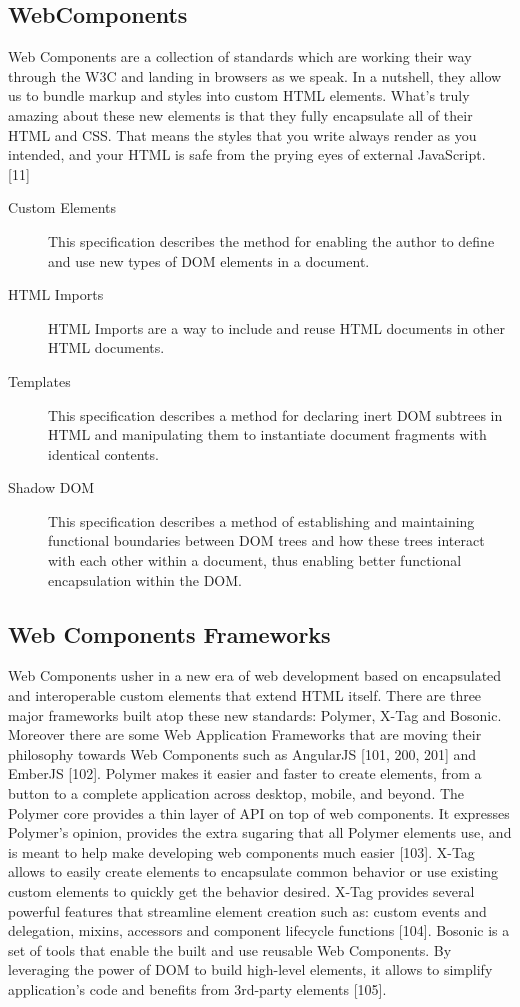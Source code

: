 \documentclass{sig-alternate}
\begin{document}
\subsection{WebComponents}

Web Components are a collection of standards which are working their way through the W3C and landing in browsers as we speak. In a nutshell, they allow us to bundle markup and styles into custom HTML elements. What's truly amazing about these new elements is that they fully encapsulate all of their HTML and CSS. That means the styles that you write always render as you intended, and your HTML is safe from the prying eyes of external JavaScript. [11]

\begin{description}
       \item[Custom Elements] This specification describes the method for enabling the author to define and use new types of DOM elements in a document.
       \item[HTML Imports] HTML Imports are a way to include and reuse HTML documents in other HTML documents.
       \item[Templates] This specification describes a method for declaring inert DOM subtrees in HTML and manipulating them to instantiate document fragments with identical contents.
       \item[Shadow DOM] This specification describes a method of establishing and maintaining functional boundaries between DOM trees and how these trees interact with each other within a document, thus enabling better functional encapsulation within the DOM.
\end{description}

\subsection{Web Components Frameworks}

Web Components usher in a new era of web development based on encapsulated and interoperable custom elements that extend HTML itself.
There are three major frameworks built atop these new standards: Polymer, X-Tag and Bosonic.
Moreover there are some Web Application Frameworks that are moving their philosophy towards Web Components such as AngularJS [101, 200, 201] and EmberJS [102].
Polymer makes it easier and faster to create elements, from a button to a complete application across desktop, mobile, and beyond. The Polymer core provides a thin layer of API on top of web components. It expresses Polymer’s opinion, provides the extra sugaring that all Polymer elements use, and is meant to help make developing web components much easier [103].
X-Tag allows to easily create elements to encapsulate common behavior or use existing custom elements to quickly get the behavior desired. X-Tag provides several powerful features that streamline element creation such as: custom events and delegation, mixins, accessors and component lifecycle functions [104].
Bosonic is a set of tools that enable the built and use reusable Web Components. By leveraging the power of DOM to build high-level elements, it allows to simplify application’s code and benefits from 3rd-party elements [105].
\end{document}

